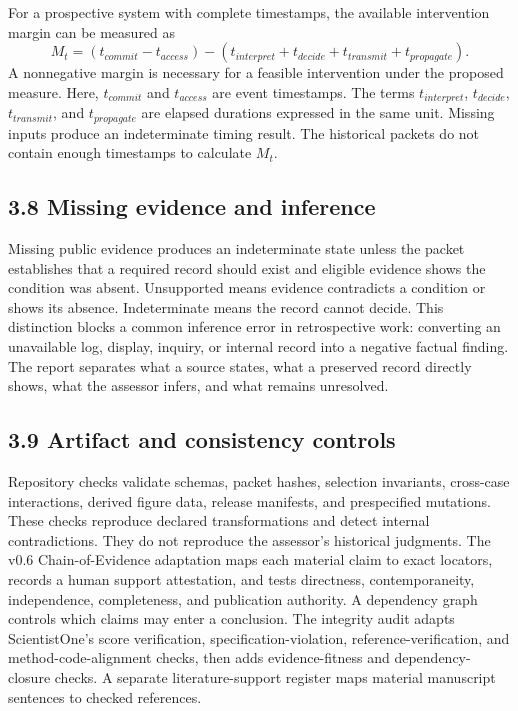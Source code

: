 \documentclass[11pt]{article}
\begin{document}
For a prospective system with complete timestamps, the available intervention margin can be measured as
\[
M_t=(t_{commit}-t_{access})-(t_{interpret}+t_{decide}+t_{transmit}+t_{propagate}).
\]
A nonnegative margin is necessary for a feasible intervention under the proposed measure. Here, $t_{commit}$ and $t_{access}$ are event timestamps. The terms $t_{interpret}$, $t_{decide}$, $t_{transmit}$, and $t_{propagate}$ are elapsed durations expressed in the same unit. Missing inputs produce an indeterminate timing result. The historical packets do not contain enough timestamps to calculate $M_t$.
\subsection*{3.8 Missing evidence and inference}
Missing public evidence produces an indeterminate state unless the packet establishes that a required record should exist and eligible evidence shows the condition was absent. Unsupported means evidence contradicts a condition or shows its absence. Indeterminate means the record cannot decide. This distinction blocks a common inference error in retrospective work: converting an unavailable log, display, inquiry, or internal record into a negative factual finding. The report separates what a source states, what a preserved record directly shows, what the assessor infers, and what remains unresolved.
\subsection*{3.9 Artifact and consistency controls}
Repository checks validate schemas, packet hashes, selection invariants, cross-case interactions, derived figure data, release manifests, and prespecified mutations. These checks reproduce declared transformations and detect internal contradictions. They do not reproduce the assessor's historical judgments.
The v0.6 Chain-of-Evidence adaptation maps each material claim to exact locators, records a human support attestation, and tests directness, contemporaneity, independence, completeness, and publication authority. A dependency graph controls which claims may enter a conclusion. The integrity audit adapts ScientistOne's score verification, specification-violation, reference-verification, and method-code-alignment checks, then adds evidence-fitness and dependency-closure checks. A separate literature-support register maps material manuscript sentences to checked references.
\end{document}
